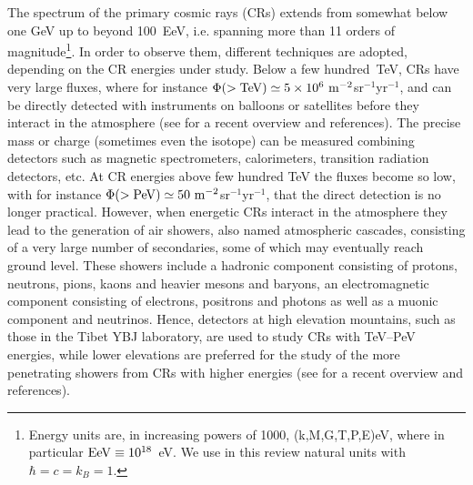 \documentclass[twoside,12pt]{article}
\begin{document}
The spectrum of the primary cosmic rays (CRs) extends from somewhat below one GeV up to beyond 100~EeV, i.e. spanning more than 11 orders of magnitude\footnote{Energy units are, in increasing powers of 1000, (k,M,G,T,P,E)eV, where in particular ${\rm EeV}\equiv 10^{18}$~eV. We use in this review natural units with $\hbar=c=k_B=1$.}.  In order to observe them, different techniques are adopted, depending on the CR energies under study.  Below a few hundred~TeV, CRs have very large fluxes, where for instance  $\Phi(>{\rm TeV})\simeq 5\times 10^6~{\rm m}^{-2}$sr$^{-1}$yr$^{-1}$, and can be directly detected with instruments on balloons or satellites before they interact in the atmosphere  (see \cite{maestro} for a recent overview and references). The precise mass or charge (sometimes even the isotope) can  be measured combining detectors such as magnetic spectrometers, calorimeters, transition radiation detectors, etc. At CR energies above few hundred TeV the fluxes become so low, with for instance $\Phi(>{\rm PeV})\simeq 50~{\rm m}^{-2}$sr$^{-1}$yr$^{-1}$, that the direct detection is no longer practical. However, when energetic CRs interact in the atmosphere they lead to the generation of air showers, also named atmospheric cascades,  consisting of a very large number of secondaries, some of which may eventually reach ground level. These showers include a hadronic component consisting of  protons, neutrons, pions, kaons and heavier mesons and baryons, an electromagnetic component consisting of electrons, positrons and  photons as well as a muonic component and neutrinos.  Hence, detectors at high elevation mountains, such as those  in the Tibet YBJ laboratory, are used to study CRs with TeV--PeV energies, while lower elevations are preferred for the study of the more penetrating showers from CRs with higher energies  (see \cite{verzi} for a recent overview and references). 
\end{document}
